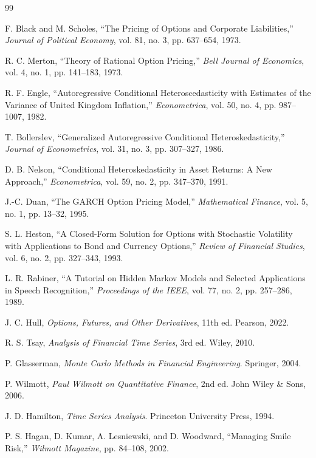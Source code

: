 \documentclass[journal]{IEEEtran}
\begin{document}
\begin{thebibliography}{99}

F. Black and M. Scholes, ``The Pricing of Options and Corporate Liabilities,'' \emph{Journal of Political Economy}, vol. 81, no. 3, pp. 637--654, 1973.

R. C. Merton, ``Theory of Rational Option Pricing,'' \emph{Bell Journal of Economics}, vol. 4, no. 1, pp. 141--183, 1973.

R. F. Engle, ``Autoregressive Conditional Heteroscedasticity with Estimates of the Variance of United Kingdom Inflation,'' \emph{Econometrica}, vol. 50, no. 4, pp. 987--1007, 1982.

T. Bollerslev, ``Generalized Autoregressive Conditional Heteroskedasticity,'' \emph{Journal of Econometrics}, vol. 31, no. 3, pp. 307--327, 1986.

D. B. Nelson, ``Conditional Heteroskedasticity in Asset Returns: A New Approach,'' \emph{Econometrica}, vol. 59, no. 2, pp. 347--370, 1991.

J.-C. Duan, ``The GARCH Option Pricing Model,'' \emph{Mathematical Finance}, vol. 5, no. 1, pp. 13--32, 1995.

S. L. Heston, ``A Closed-Form Solution for Options with Stochastic Volatility with Applications to Bond and Currency Options,'' \emph{Review of Financial Studies}, vol. 6, no. 2, pp. 327--343, 1993.

L. R. Rabiner, ``A Tutorial on Hidden Markov Models and Selected Applications in Speech Recognition,'' \emph{Proceedings of the IEEE}, vol. 77, no. 2, pp. 257--286, 1989.

J. C. Hull, \emph{Options, Futures, and Other Derivatives}, 11th ed. Pearson, 2022.

R. S. Tsay, \emph{Analysis of Financial Time Series}, 3rd ed. Wiley, 2010.

P. Glasserman, \emph{Monte Carlo Methods in Financial Engineering}. Springer, 2004.

P. Wilmott, \emph{Paul Wilmott on Quantitative Finance}, 2nd ed. John Wiley \& Sons, 2006.

J. D. Hamilton, \emph{Time Series Analysis}. Princeton University Press, 1994.

P. S. Hagan, D. Kumar, A. Lesniewski, and D. Woodward, ``Managing Smile Risk,'' \emph{Wilmott Magazine}, pp. 84--108, 2002.


\end{thebibliography}
\end{document}
